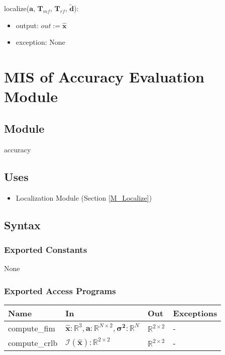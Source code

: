 \documentclass[12pt, titlepage]{article}
\begin{document}
\noindent localize($\mathbf{a}$, $\mathbf{T}_{mf}$, $\mathbf{T}_{rf}$, $\mathbf{\tilde{d}}$):
\begin{itemize}
\item output: $out:= \mathbf{\hat{x}}$
\item exception: None
\end{itemize}

\newpage

\section{MIS of Accuracy Evaluation Module} \label{M_Accurate}

\subsection{Module}

accuracy

\subsection{Uses}
\begin{itemize}
  \item Localization Module (Section \ref{M_Localize})
\end{itemize}


\subsection{Syntax}

\subsubsection{Exported Constants}
None

\subsubsection{Exported Access Programs}

\begin{center}
\begin{tabular}{p{4cm} p{5cm} p{4cm} p{2cm}}
\hline
\textbf{Name} & \textbf{In} & \textbf{Out} & \textbf{Exceptions} \\
\hline
compute\_fim & $\hat{\mathbf{x}}: \mathbb{R}^3, \mathbf{a}: \mathbb{R}^{N \times 2}, \boldsymbol{\sigma^2}: \mathbb{R}^N$  & $\mathbb{R}^{2 \times 2}$ & - \\
compute\_crlb & $\boldsymbol{\mathcal{I}}(\hat{\mathbf{x}}): \mathbb{R}^{2 \times 2}$ & $\mathbb{R}^{2 \times 2}$ & - \\
\hline
\end{tabular}
\end{center}
\end{document}
